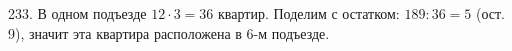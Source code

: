 233. В одном подъезде $12\cdot3=36$ квартир. Поделим с остатком: $189:36=5$ (ост. 9), значит эта квартира расположена в 6-м  подъезде.\\
